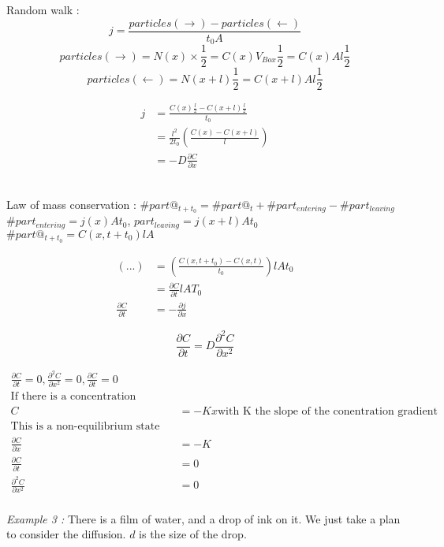 \documentclass[10pt,a4paper]{article}
\begin{document}
Random walk :
\[ j = \frac{particles(\rightarrow)-particles(\leftarrow)}{t_0 A} \]
\[ particles(\rightarrow) = N(x)\times \frac{1}{2} = C(x)V_{Box}\frac{1}{2} = C(x)Al\frac{1}{2} \]
\[ particles (\leftarrow) = N(x+l)\frac{1}{2} = C(x+l)Al\frac{1}{2} \]


\begin{align*}
    j &= \frac{C(x)\frac{l}{2} - C(x+l)\frac{l}{2}}{t_0}\\
    &= \frac{l^2}{2t_0}\left( \frac{C(x) - C(x+l)}{l} \right)\\
    &= -D\frac{\partial C}{\partial x}
\end{align*}

~\\
Law of mass conservation : $\#part@_{t+t_0} = \#part@_t + \#part_{entering} - \#part_{leaving}$\\
$\#part_{entering} = j(x)At_0$, $part_{leaving} = j(x+l)At_0$\\
$\#part@_{t+t_0} = C(x,t+t_0)lA$

\begin{align*}
(...) &= \left( \frac{C(x,t+t_0) - C(x,t)}{t_0} \right) lAt_0\\
&= \frac{\partial C}{\partial t}lAT_0\\
\frac{\partial C}{\partial t} &= -\frac{\partial j}{\partial x}
\end{align*}

\[ \frac{\partial C}{\partial t} = D\frac{\partial^2C}{\partial x^2} \]


\begin{align*}
\frac{\partial C}{\partial t} = 0,\frac{\partial^2 C}{\partial x^2}=0, \frac{\partial C}{\partial t} =0\\
\text{If there is a concentration gradient :}\\
C &= -Kx \text{with K the slope of the conentration gradient}\\
\text{This is a non-equilibrium state}\\
\frac{\partial C}{\partial x} &= -K\\
\frac{\partial C}{\partial t} &= 0\\
\frac{\partial ^2 C}{\partial x^2} &= 0\\
\end{align*}

\emph{Example 3 :} There is a film of water, and a drop of ink on it. We just take a plan to consider the diffusion. $d$ is the size of the drop.
\end{document}
